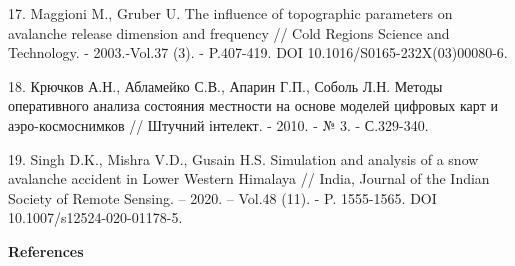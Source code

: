 \begin{references}
17. Maggioni M., Gruber U. The influence of topographic parameters on
avalanche release dimension and frequency // Cold Regions Science and
Technology. - 2003.-Vol.37 (3). - P.407-419. DOI
10.1016/S0165-232X(03)00080-6.

18. Крючков А.Н., Абламейко С.В., Апарин Г.П., Соболь Л.Н. Методы
оперативного анализа состояния местности на основе моделей цифровых карт
и аэро-космоснимков // Штучний інтелект. - 2010. - № 3. - С.329-340.

19. Singh D.K., Mishra V.D., Gusain H.S. Simulation and analysis of a
snow avalanche accident in Lower Western Himalaya // India, Journal of
the Indian Society of Remote Sensing. -- 2020. -- Vol.48 (11). - P.
1555-1565. DOI 10.1007/s12524-020-01178-5.
\end{references}

\begin{center}
{\bfseries References}
\end{center}

